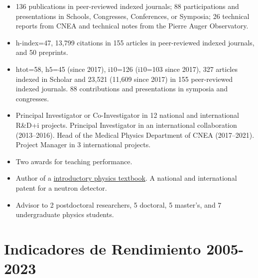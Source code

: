 \begin{itemize}
\item {} 136 publications in peer-reviewed indexed journals; 88 participations and presentations in Schools, Congresses, Conferences, or Symposia; 26 technical reports from CNEA and technical notes from the Pierre Auger Observatory.
\item {} h-index=47, 13,799 citations in 155 articles in peer-reviewed indexed journals, and 50 preprints.
\item {} h${\text{tot}}$=58, h$5$=45 (since 2017), i${10}$=126 (i${10}$=103 since 2017), 327 articles indexed in Scholar and 23,521 (11,609 since 2017) in 155 peer-reviewed indexed journals. 88 contributions and presentations in symposia and congresses.
\item {} Principal Investigator or Co-Investigator in 12 national and international R\&D+i projects. Principal Investigator in an international collaboration (2013--2016). Head of the Medical Physics Department of CNEA (2017--2021). Project Manager in 3 international projects.
\item {} Two awards for teaching performance.
\item {} Author of a \href{https://editorial.unrn.edu.ar/index.php/catalogo/346/view_bl/62/lecturas-de-catedra/92/fisica-ia-de-las-galaxias-a-los-quarks}{introductory physics textbook}. A national and international patent for a neutron detector.
\item {} Advisor to 2 postdoctoral researchers, 5 doctoral, 5 master's, and 7 undergraduate physics students.
\end{itemize}

\else
\section*{Indicadores de Rendimiento 2005-2023}


